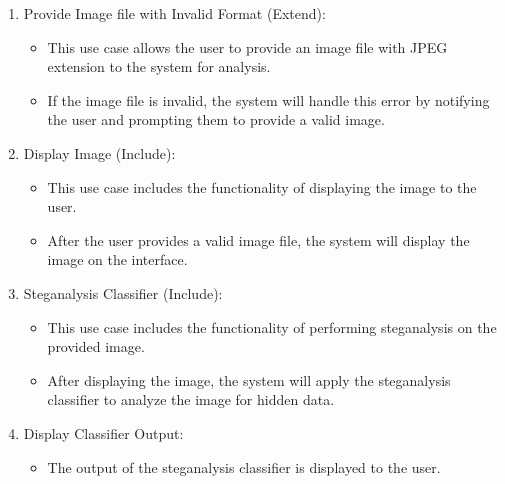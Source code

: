 \begin{enumerate}[noitemsep]
    \item Provide Image file with Invalid Format (Extend):
    \begin{itemize}
        \item This use case allows the user to provide an image file with JPEG extension to the system for analysis.
        \item If the image file is invalid, the system will handle this error by notifying the user and prompting them to provide a valid image.
    \end{itemize}
    \clearpage
    \item Display Image (Include):
    \begin{itemize}
        \item This use case includes the functionality of displaying the image to the user.
        \item After the user provides a valid image file, the system will display the image on the interface.
    \end{itemize}
    
    \item Steganalysis Classifier (Include):
    \begin{itemize}
        \item This use case includes the functionality of performing steganalysis on the provided image.
        \item After displaying the image, the system will apply the steganalysis classifier to analyze the image for hidden data.
    \end{itemize}
    
    \item Display Classifier Output:
    \begin{itemize}
        \item The output of the steganalysis classifier is displayed to the user.
    \end{itemize}
\end{enumerate}
\clearpage
